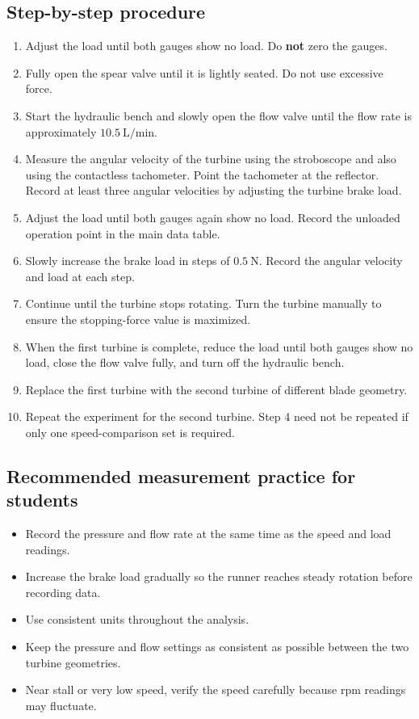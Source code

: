 \documentclass[12pt,letterpaper]{article}
\begin{document}
\subsection*{Step-by-step procedure}
\begin{enumerate}[leftmargin=*, label=\arabic*.]
    \item Adjust the load until both gauges show no load. Do \textbf{not} zero the gauges.
    \item Fully open the spear valve until it is lightly seated. Do not use excessive force.
    \item Start the hydraulic bench and slowly open the flow valve until the flow rate is approximately \(10.5~\text{L/min}\).
    \item Measure the angular velocity of the turbine using the stroboscope and also using the contactless tachometer. Point the tachometer at the reflector. Record at least three angular velocities by adjusting the turbine brake load.
    \item Adjust the load until both gauges again show no load. Record the unloaded operation point in the main data table.
    \item Slowly increase the brake load in steps of \(0.5~\text{N}\). Record the angular velocity and load at each step.
    \item Continue until the turbine stops rotating. Turn the turbine manually to ensure the stopping-force value is maximized.
    \item When the first turbine is complete, reduce the load until both gauges show no load, close the flow valve fully, and turn off the hydraulic bench.
    \item Replace the first turbine with the second turbine of different blade geometry.
    \item Repeat the experiment for the second turbine. Step 4 need not be repeated if only one speed-comparison set is required.
\end{enumerate}

\subsection*{Recommended measurement practice for students}
\begin{itemize}[leftmargin=*]
    \item Record the pressure and flow rate at the same time as the speed and load readings.
    \item Increase the brake load gradually so the runner reaches steady rotation before recording data.
    \item Use consistent units throughout the analysis.
    \item Keep the pressure and flow settings as consistent as possible between the two turbine geometries.
    \item Near stall or very low speed, verify the speed carefully because rpm readings may fluctuate.
\end{itemize}
\end{document}
